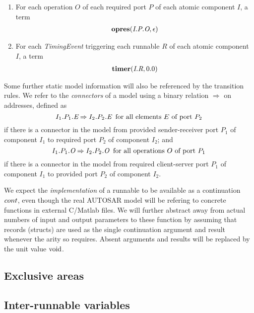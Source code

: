 \documentclass[twocolumn]{article}
\begin{document}
\begin{enumerate}
\item For each operation $O$ of each required port $P$ of each atomic component $I$, a term
\[
\begin{array}{c}
	\Topres{\Tep{O}{P}{I}}{\epsilon}
\end{array}
\]

\item For each \emph{TimingEvent} triggering each runnable $R$ of each atomic component $I$, a term
\[
\begin{array}{c}
	\Ttimer{\Tr{R}{I}}{0.0}
\end{array}
\]

\end{enumerate}

Some further static model information will also be referenced by the transition rules. We refer to the \emph{connectors} of a model using a binary relation $\Rightarrow$ on addresses, defined as
\[
	\Tconnect{\Tep{E}{$P_1$}{$I_1$}}{\Tep{E}{$P_2$}{$I_2$}} \;\;\text{for all elements $E$ of port $P_2$}
\]
if there is a connector in the model from provided sender-receiver port $P_1$ of component $I_1$ to required port $P_2$ of component $I_2$; and
\[
	\Tconnect{\Top{O}{$P_1$}{$I_1$}}{\Top{O}{$P_2$}{$I_2$}} \;\;\text{for all operations $O$ of port $P_1$}
\]
if there is a connector in the model from required client-server port $P_1$ of component $I_1$ to provided port $P_2$ of component $I_2$.

We expect the \emph{implementation} of a runnable to be available as a continuation $\Cont$, even though the real AUTOSAR model will be refering to concrete functions in external C/Matlab files. We will further abstract away from actual numbers of input and output parameters to these function by assuming that records (structs) are used as the single continuation argument and result whenever the arity so requires. Absent arguments and results will be replaced by the unit value $\Tvoid$.

\subsection{Exclusive areas}


\subsection{Inter-runnable variables}
\end{document}
